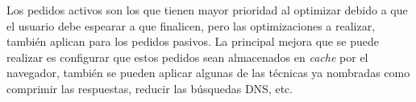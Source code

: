 \documentclass[a4paper,12pt]{report}
\begin{document}
Los pedidos activos son los que tienen mayor prioridad al optimizar debido a que el usuario debe espearar a que finalicen, pero las optimizaciones a realizar, también
aplican para los pedidos pasivos. La principal mejora que se puede realizar es configurar que estos pedidos sean almacenados en \emph{cache} por el navegador, también se pueden
aplicar algunas de las técnicas ya nombradas como comprimir las respuestas, reducir las búsquedas DNS, etc.


  

\listoftodos
\end{document}
